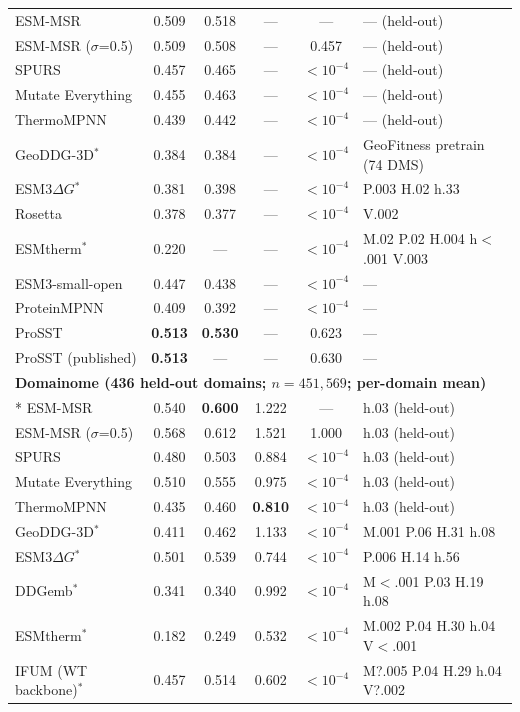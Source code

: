 {\begin{longtable}{lccccl}
\midrule
ESM-MSR & 0.509 & 0.518 & --- & --- & --- (held-out) \\
ESM-MSR ($\sigma$=0.5) & 0.509 & 0.508 & --- & 0.457 & --- (held-out) \\
SPURS & 0.457 & 0.465 & --- & $<10^{-4}$ & --- (held-out) \\
Mutate Everything & 0.455 & 0.463 & --- & $<10^{-4}$ & --- (held-out) \\
ThermoMPNN & 0.439 & 0.442 & --- & $<10^{-4}$ & --- (held-out) \\
GeoDDG-3D$^*$ & 0.384 & 0.384 & --- & $<10^{-4}$ & GeoFitness pretrain (74 DMS) \\
ESM3$\Delta G$$^*$ & 0.381 & 0.398 & --- & $<10^{-4}$ & P.003 H.02 h.33 \\
Rosetta & 0.378 & 0.377 & --- & $<10^{-4}$ & V.002 \\
ESMtherm$^*$ & 0.220 & --- & --- & $<10^{-4}$ & M.02 P.02 H.004 h$<$.001 V.003 \\
ESM3-small-open & 0.447 & 0.438 & --- & $<10^{-4}$ & --- \\
ProteinMPNN & 0.409 & 0.392 & --- & $<10^{-4}$ & --- \\
ProSST & \textbf{0.513} & \textbf{0.530} & --- & 0.623 & --- \\
ProSST (published) & \textbf{0.513} & --- & --- & 0.630 & --- \\
\midrule
\multicolumn{6}{l}{\textbf{Domainome (436 held-out domains; $n=451{,}569$; per-domain mean)}} \\*
\midrule
ESM-MSR & 0.540 & \textbf{0.600} & 1.222 & --- & h.03 (held-out) \\
ESM-MSR ($\sigma$=0.5) & 0.568 & 0.612 & 1.521 & 1.000 & h.03 (held-out) \\
SPURS & 0.480 & 0.503 & 0.884 & $<10^{-4}$ & h.03 (held-out) \\
Mutate Everything & 0.510 & 0.555 & 0.975 & $<10^{-4}$ & h.03 (held-out) \\
ThermoMPNN & 0.435 & 0.460 & \textbf{0.810} & $<10^{-4}$ & h.03 (held-out) \\
GeoDDG-3D$^*$ & 0.411 & 0.462 & 1.133 & $<10^{-4}$ & M.001 P.06 H.31 h.08 \\
ESM3$\Delta G$$^*$ & 0.501 & 0.539 & 0.744 & $<10^{-4}$ & P.006 H.14 h.56 \\
DDGemb$^*$ & 0.341 & 0.340 & 0.992 & $<10^{-4}$ & M$<$.001 P.03 H.19 h.08 \\
ESMtherm$^*$ & 0.182 & 0.249 & 0.532 & $<10^{-4}$ & M.002 P.04 H.30 h.04 V$<$.001 \\
IFUM (WT backbone)$^*$ & 0.457 & 0.514 & 0.602 & $<10^{-4}$ & M?.005 P.04 H.29 h.04 V?.002 \\

\end{longtable}}
